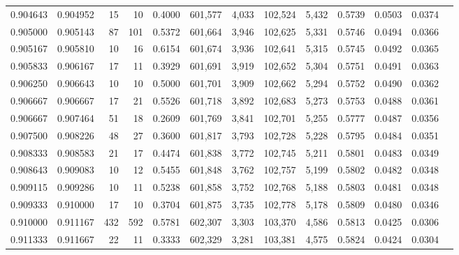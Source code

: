 \begin{tabular}{rrrrrrrrrrrrr}
0.904643 & 0.904952 &    15 &  10 &                                     0.4000 & 601,577 &   4,033 & 102,524 &   5,432 & 0.5739 & 0.0503 & 0.0374 \\
0.905000 & 0.905143 &    87 & 101 &                                     0.5372 & 601,664 &   3,946 & 102,625 &   5,331 & 0.5746 & 0.0494 & 0.0366 \\
0.905167 & 0.905810 &    10 &  16 &                                     0.6154 & 601,674 &   3,936 & 102,641 &   5,315 & 0.5745 & 0.0492 & 0.0365 \\
0.905833 & 0.906167 &    17 &  11 &                                     0.3929 & 601,691 &   3,919 & 102,652 &   5,304 & 0.5751 & 0.0491 & 0.0363 \\
0.906250 & 0.906643 &    10 &  10 &                                     0.5000 & 601,701 &   3,909 & 102,662 &   5,294 & 0.5752 & 0.0490 & 0.0362 \\
0.906667 & 0.906667 &    17 &  21 &                                     0.5526 & 601,718 &   3,892 & 102,683 &   5,273 & 0.5753 & 0.0488 & 0.0361 \\
0.906667 & 0.907464 &    51 &  18 &                                     0.2609 & 601,769 &   3,841 & 102,701 &   5,255 & 0.5777 & 0.0487 & 0.0356 \\
0.907500 & 0.908226 &    48 &  27 &                                     0.3600 & 601,817 &   3,793 & 102,728 &   5,228 & 0.5795 & 0.0484 & 0.0351 \\
0.908333 & 0.908583 &    21 &  17 &                                     0.4474 & 601,838 &   3,772 & 102,745 &   5,211 & 0.5801 & 0.0483 & 0.0349 \\
0.908643 & 0.909083 &    10 &  12 &                                     0.5455 & 601,848 &   3,762 & 102,757 &   5,199 & 0.5802 & 0.0482 & 0.0348 \\
0.909115 & 0.909286 &    10 &  11 &                                     0.5238 & 601,858 &   3,752 & 102,768 &   5,188 & 0.5803 & 0.0481 & 0.0348 \\
0.909333 & 0.910000 &    17 &  10 &                                     0.3704 & 601,875 &   3,735 & 102,778 &   5,178 & 0.5809 & 0.0480 & 0.0346 \\
0.910000 & 0.911167 &   432 & 592 &                                     0.5781 & 602,307 &   3,303 & 103,370 &   4,586 & 0.5813 & 0.0425 & 0.0306 \\
0.911333 & 0.911667 &    22 &  11 &                                     0.3333 & 602,329 &   3,281 & 103,381 &   4,575 & 0.5824 & 0.0424 & 0.0304 \\

\end{tabular}
